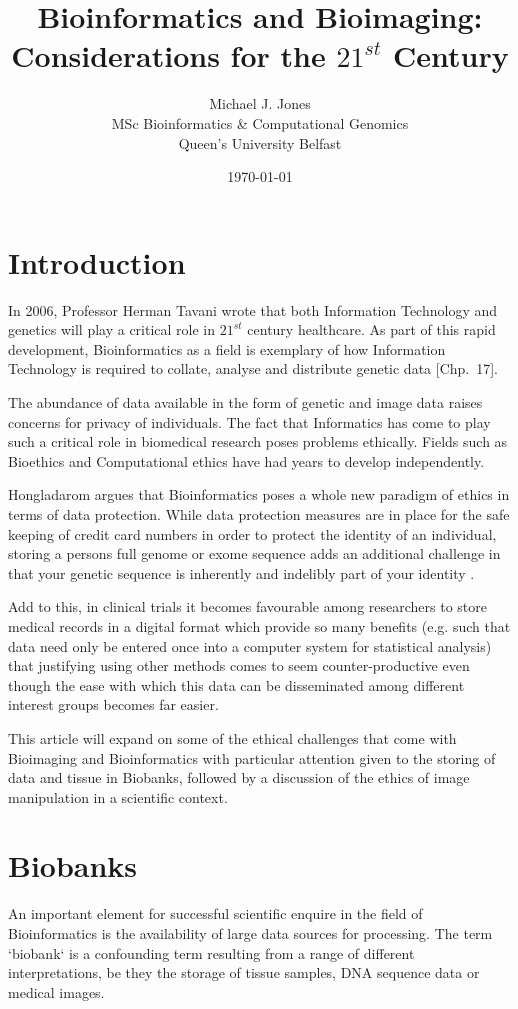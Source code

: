 \documentclass[british,a4paper, 12pt]{article}
\title{Bioinformatics and Bioimaging: Considerations for the $21^{st}$ Century}
\author{Michael J. Jones \\
  MSc Bioinformatics \& Computational Genomics \\
  Queen's University Belfast}
\date{\today}
\begin{document}
\maketitle

\section{Introduction}
In 2006, Professor Herman Tavani wrote that both Information Technology and
genetics will play a critical role in $21^{st}$ century healthcare. As part of
this rapid development, Bioinformatics as a field is exemplary of how
Information Technology is required to collate, analyse and distribute genetic
data \parencite{tavani2006ethics}[Chp.~17].

The abundance of data available in the form of genetic and image data raises
concerns for privacy of individuals. The fact that Informatics has come to
play such a critical role in biomedical research poses problems ethically.
Fields such as Bioethics and Computational ethics have had years to develop
independently.

Hongladarom argues that Bioinformatics poses a whole new paradigm of ethics in
terms of data protection. While data protection measures are in place for the
safe keeping of credit card numbers in order to protect the identity of an
individual, storing a persons full genome or exome sequence adds an additional
challenge in that your genetic sequence is inherently and indelibly part of
your identity \parencite{hongladarom2006ethics}.

Add to this, in clinical trials it becomes favourable among researchers to 
store medical records in a digital format which provide so many benefits (e.g. 
such that data need only be entered once into a computer system for statistical 
analysis) \parencite{parizel2011keep} that justifying using other methods comes to seem
counter-productive even though the ease with which this data can be disseminated among
different interest groups becomes far easier.

This article will expand on some of the ethical challenges that come with
Bioimaging and Bioinformatics with particular attention given to the storing
of data and tissue in Biobanks, followed by a discussion of the ethics of
image manipulation in a scientific context.

\section{Biobanks}
An important element for successful scientific enquire in the field of
Bioinformatics is the availability of large data sources for processing. The
term `biobank` is a confounding term resulting from a range of different
interpretations, be they the storage of tissue samples, DNA sequence data or
medical images.
\end{document}
